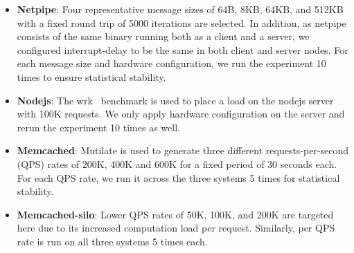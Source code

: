 \begin{itemize}
\item \textbf{Netpipe}: Four representative message sizes of 64B, 8KB, 64KB,
and 512KB with a fixed round trip of 5000 iterations are selected. In addition,
as netpipe consists of the same binary running both as a client and a server,
we configured interrupt-delay to be the same in both client and server nodes.
For each message size and hardware configuration, we run the experiment 10
times to ensure statistical stability.
    
\item \textbf{Nodejs}: The wrk~\cite{wrk} benchmark is used to place a load on
the nodejs server with 100K requests. We only apply hardware configuration on the
server and rerun the experiment 10 times as well.
    
\item \textbf{Memcached}: Mutilate is used to generate three different
requests-per-second (QPS) rates of 200K, 400K and 600K for a fixed period of 30
seconds each. For each QPS rate, we run it across the three systems 5 times for
statistical stability.
    
\item \textbf{Memcached-silo}: Lower QPS rates of 50K, 100K, and 200K are
targeted here due to its increased computation load per request. Similarly, per
QPS rate is run on all three systems 5 times each.
\end{itemize}



    
